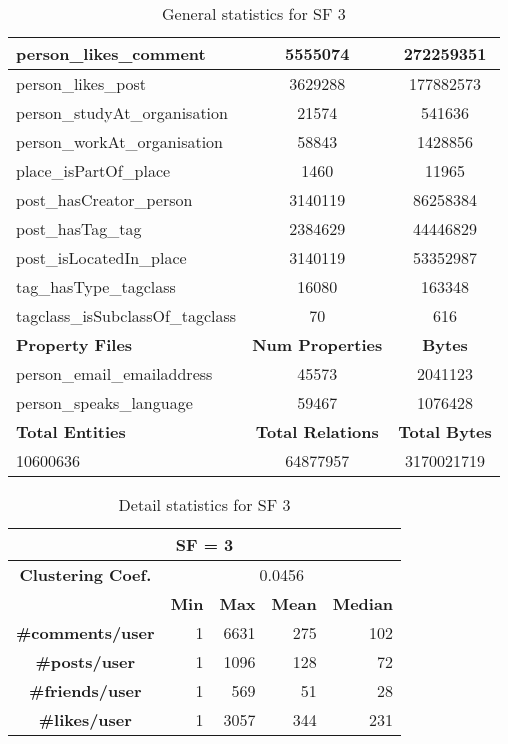 \begin{table}[H]
\begin{tabular} {| l | c | c |}
        \hline
        person\_likes\_comment & 5555074 & 272259351 \\
        \hline
        person\_likes\_post & 3629288 & 177882573 \\
        \hline
        person\_studyAt\_organisation & 21574 & 541636 \\
        \hline
        person\_workAt\_organisation & 58843 & 1428856 \\
        \hline
        place\_isPartOf\_place & 1460 & 11965 \\
        \hline
        post\_hasCreator\_person & 3140119 & 86258384 \\
        \hline
        post\_hasTag\_tag & 2384629 & 44446829 \\
        \hline
        post\_isLocatedIn\_place & 3140119 & 53352987 \\
        \hline
        tag\_hasType\_tagclass & 16080 & 163348 \\
        \hline
        tagclass\_isSubclassOf\_tagclass & 70 & 616 \\
        \hline
        \hline
        \textbf{Property Files} & \textbf{Num Properties} & \textbf{Bytes} \\
        \hline
        \hline
        person\_email\_emailaddress & 45573 & 2041123 \\
        \hline
        person\_speaks\_language & 59467 & 1076428 \\
        \hline
        \hline
        \textbf{Total Entities} & \textbf{Total Relations} & \textbf{Total Bytes} \\
        \hline
        \hline
         10600636 & 64877957 & 3170021719 \\
        \hline
    \end{tabular}
    \caption{General statistics for SF 3}
\end{table}

\begin{table}[H]
    \centering
\begin{tabular}{|c||r|r|r|r|}
\hline    \multicolumn{5}{|c|}{SF = 3 }  \\
\hline   \textbf{Clustering Coef.} &   \multicolumn{4}{|c|}{0.0456} \\
\hline & \textbf{Min} & \textbf{Max} & \textbf{Mean} & \textbf{Median}   \\
\hline  \textbf{\#comments/user}  &1 &  6631 & 275 & 102 \\
\hline  \textbf{\#posts/user}  &1 &  1096 & 128 & 72 \\
\hline  \textbf{\#friends/user}  &1 &  569 & 51 & 28 \\
\hline  \textbf{\#likes/user}  &1 &  3057 & 344 & 231 \\
\hline
\end{tabular}
\caption{Detail statistics for SF 3}
\end{table}

